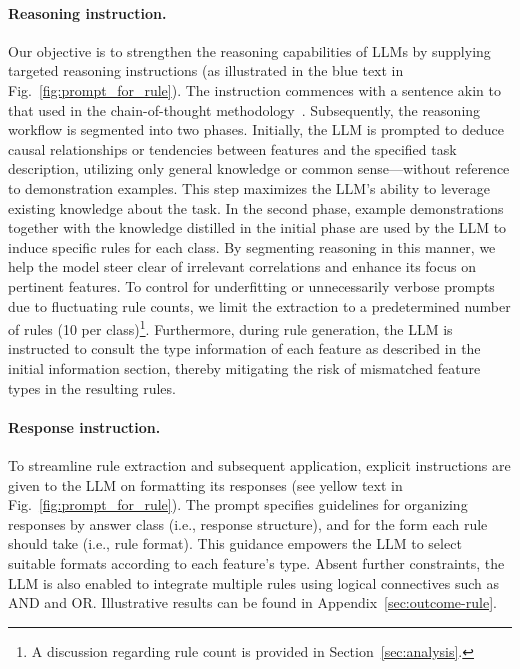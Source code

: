 \vspace*{-0.12in}
\paragraph{Reasoning instruction.} Our objective is to strengthen the reasoning capabilities of LLMs by supplying targeted reasoning instructions (as illustrated in the blue text in Fig.~\ref{fig:prompt_for_rule}). The instruction commences with a sentence akin to that used in the chain-of-thought methodology~\cite{wei2022chain}. Subsequently, the reasoning workflow is segmented into two phases. Initially, the LLM is prompted to deduce causal relationships or tendencies between features and the specified task description, utilizing only general knowledge or common sense—without reference to demonstration examples. This step maximizes the LLM’s ability to leverage existing knowledge about the task. In the second phase, example demonstrations together with the knowledge distilled in the initial phase are used by the LLM to induce specific rules for each class. By segmenting reasoning in this manner, we help the model steer clear of irrelevant correlations and enhance its focus on pertinent features. To control for underfitting or unnecessarily verbose prompts due to fluctuating rule counts, we limit the extraction to a predetermined number of rules (10 per class)\footnote{A discussion regarding rule count is provided in Section~\ref{sec:analysis}.}. Furthermore, during rule generation, the LLM is instructed to consult the type information of each feature as described in the initial information section, thereby mitigating the risk of mismatched feature types in the resulting rules. 

\vspace*{-0.12in}
\paragraph{Response instruction.} To streamline rule extraction and subsequent application, explicit instructions are given to the LLM on formatting its responses (see yellow text in Fig.~\ref{fig:prompt_for_rule}). The prompt specifies guidelines for organizing responses by answer class (i.e., response structure), and for the form each rule should take (i.e., rule format). This guidance empowers the LLM to select suitable formats according to each feature’s type. Absent further constraints, the LLM is also enabled to integrate multiple rules using logical connectives such as AND and OR. Illustrative results can be found in Appendix~\ref{sec:outcome-rule}.

